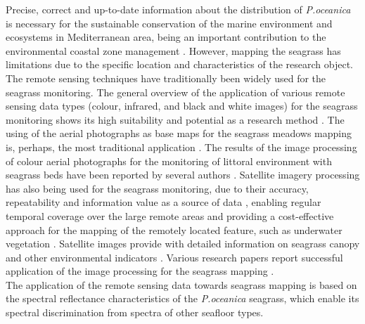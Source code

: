 \documentclass[11pt]{article}
\begin{document}
Precise, correct and up-to-date information about the distribution of \textit{P.oceanica} is necessary for the
sustainable conservation of the marine environment and ecosystems in Mediterranean area, being an
important contribution to the environmental coastal zone management \cite{Pergent-Martini06}\label{Pergent-Martini06}.
However, mapping the seagrass has limitations due to the specific location and characteristics of the
research object. \\
The remote sensing techniques have traditionally been widely used for the seagrass
monitoring. The general overview of the application of various remote sensing data types (colour,
infrared, and black and white images) for the seagrass monitoring shows its high suitability and
potential as a research method \cite{Pasqualini01,Matarrese06}\label{Pasqualini01}\label{Matarrese06}. The using of the aerial
photographs as base maps for the seagrass meadows mapping is, perhaps, the most traditional
application \cite{McKenzie03,Kendrick00,Pasqualini99}\label{McKenzie03} \label{Kendrick00} \label{Pasqualini99}. The results of the image
processing of colour aerial photographs for the monitoring of littoral environment with seagrass beds
have been reported by several authors \cite{Kelly80,Walker89,Green96}\label{Kelly80}\label{Walker89}\label{Green96}.
Satellite imagery processing has also being used for the seagrass monitoring, due to their accuracy,
repeatability and information value as a source of data \cite{Dekker05b}\label{Dekker05b}, enabling regular temporal
coverage over the large remote areas and providing a cost-effective approach for the mapping of the
remotely located feature, such as underwater vegetation \cite{Jensen95}\label{Jensen95}. Satellite images provide
with detailed information on seagrass canopy and other environmental indicators \cite{Fyfe03}\label{Fyfe03}.
Various research papers report successful application of the image processing for the
seagrass mapping \cite{Calvo03,Dekker05a,Fornes06,Green96,Jackson07,Jensen95,Kendrick00,Lyzenga81,Malthus03,Matarrese08,Mount03,Pasqualini01,Pasqualini99,Pasqualini98a,Pergent-Martini06,Ralph05,Ribed02,Short01,Walker89}\label{Calvo03}\label{Dekker05a}\label{Fornes06}\label{Green96}\label{Jackson07}\label{Jensen95}\label{Kendrick00}\label{Lyzenga81}\label{Malthus03}\label{Matarrese08}\label{Mount03}\label{Pasqualini01}\label{Pasqualini99}\label{Pasqualini98a}\label{Pergent-Martini06}\label{Ralph05}\label{Ribed02}\label{Short01}\label{Walker89}. \\The application of the remote sensing data towards seagrass mapping is based on the spectral reflectance  characteristics of the \textit{P.oceanica} seagrass, which enable its spectral discrimination from spectra of other seafloor types. 
\end{document}
